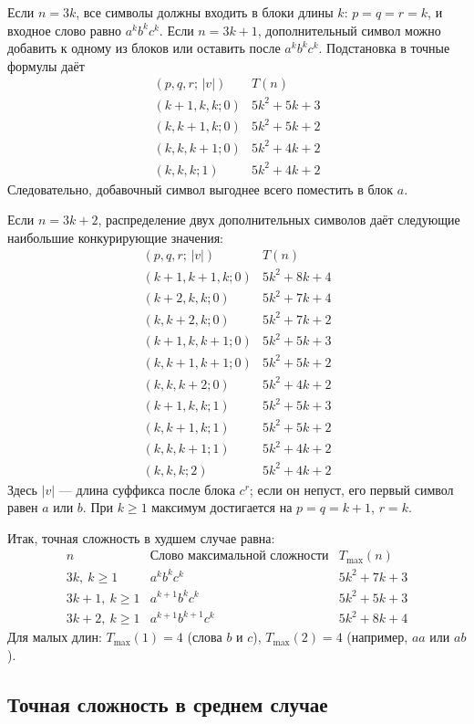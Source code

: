 \documentclass[12pt]{article}
\begin{document}
Если $n=3k$, все символы должны входить в блоки длины $k$:
$p=q=r=k$, и входное слово равно $a^k b^k c^k$.
Если $n=3k+1$, дополнительный символ можно добавить к одному из блоков
или оставить после $a^k b^k c^k$. Подстановка в точные формулы даёт
\[
\begin{array}{c|c}
(p,q,r;\,|v|) & T(n)\\ \hline
(k+1,k,k;0) & 5k^2+5k+3\\
(k,k+1,k;0) & 5k^2+5k+2\\
(k,k,k+1;0) & 5k^2+4k+2\\
(k,k,k;1) & 5k^2+4k+2
\end{array}
\]
Следовательно, добавочный символ выгоднее всего поместить в блок $a$.

Если $n=3k+2$, распределение двух дополнительных символов даёт
следующие наибольшие конкурирующие значения:
\[
\begin{array}{c|c}
(p,q,r;\,|v|) & T(n)\\ \hline
(k+1,k+1,k;0) & 5k^2+8k+4\\
(k+2,k,k;0) & 5k^2+7k+4\\
(k,k+2,k;0) & 5k^2+7k+2\\
(k+1,k,k+1;0) & 5k^2+5k+3\\
(k,k+1,k+1;0) & 5k^2+5k+2\\
(k,k,k+2;0) & 5k^2+4k+2\\
(k+1,k,k;1) & 5k^2+5k+3\\
(k,k+1,k;1) & 5k^2+5k+2\\
(k,k,k+1;1) & 5k^2+4k+2\\
(k,k,k;2) & 5k^2+4k+2
\end{array}
\]
Здесь $|v|$ --- длина суффикса после блока $c^r$; если он непуст,
его первый символ равен $a$ или $b$. При $k\ge1$ максимум достигается
на $p=q=k+1$, $r=k$.

Итак, точная сложность в худшем случае равна:
\[
\begin{array}{c|c|c}
 n & \text{Слово максимальной сложности} & T_{\max}(n)\\ \hline
3k,\ k\geq1 & a^k b^k c^k & 5k^2+7k+3\\
3k+1,\ k\geq1 & a^{k+1}b^kc^k & 5k^2+5k+3\\
3k+2,\ k\geq1 & a^{k+1}b^{k+1}c^k & 5k^2+8k+4
\end{array}
\]
Для малых длин: $T_{\max}(1)=4$ (слова $b$ и $c$),
$T_{\max}(2)=4$ (например, $aa$ или $ab$).

\subsection*{Точная сложность в среднем случае}
\end{document}

